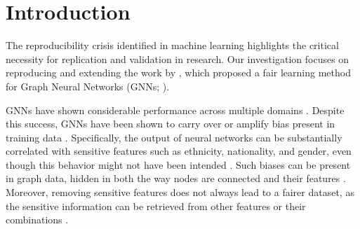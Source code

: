 \section{Introduction}

The reproducibility crisis identified in machine learning \citep{kapoor2022leakage} highlights the critical necessity for replication and validation in research. 
Our investigation focuses on reproducing and extending the work by \citealp{ling2023learning}, which proposed a fair learning method for Graph Neural Networks (GNNs; \citealp{kipf2017semisupervised}).

GNNs have shown considerable performance \citep{gao2019graph, liu2021fast, liu2021dig, yuan2021explainability} across multiple domains \citep{hamaguchi2017knowledge, liu2022spherical, han2022g, hamilton2017inductive}. 
Despite this success, GNNs have been shown to carry over or amplify bias present in training data \citep{dai2021say, mehrabi2021survey, olteanu2019social}. Specifically, the output of neural networks can be substantially correlated with sensitive features such as ethnicity, nationality, and gender, even though this behavior might not have been intended  \citep{dai2021say}.
Such biases can be present in graph data, hidden in both the way nodes are connected and their features \citep{mehrabi2021survey, olteanu2019social}. 
Moreover, removing sensitive features does not always lead to a fairer dataset, as the sensitive information can be retrieved from other features or their combinations \citep{sweeney2002k}.

